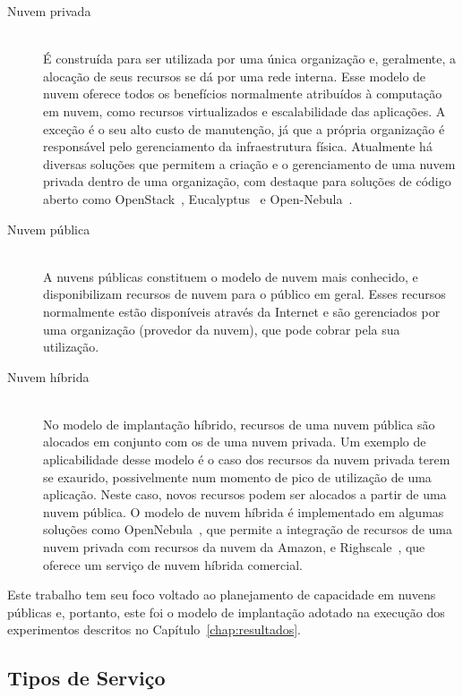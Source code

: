 \begin{description}
\item[Nuvem privada] \hfill \\ É construída para ser utilizada por uma única 
organização e, geralmente, a alocação de seus recursos se dá por uma rede interna. 
Esse modelo de nuvem oferece todos os benefícios normalmente atribuídos à computação 
em nuvem, como recursos virtualizados e escalabilidade das aplicações. A exceção 
é o seu alto custo de manutenção, já que a própria organização é responsável pelo 
gerenciamento da infraestrutura física. Atualmente há diversas soluções que permitem 
a criação e o gerenciamento de uma nuvem privada dentro de uma organização, com 
destaque para soluções de código aberto como OpenStack~\cite{openstack}, 
Eucalyptus~\cite{eucalyptus} e Open-Nebula~\cite{opennebula}.

\item[Nuvem pública] \hfill \\ A nuvens públicas constituem o modelo de nuvem 
mais conhecido, e disponibilizam recursos de nuvem para o público em geral. Esses 
recursos normalmente estão disponíveis através da Internet e são gerenciados por 
uma organização (provedor da nuvem), que pode cobrar pela sua utilização. 

\item[Nuvem híbrida] \hfill \\ No modelo de implantação híbrido, recursos de uma 
nuvem pública são alocados em conjunto com os de uma nuvem privada. Um exemplo de 
aplicabilidade desse modelo é o caso dos recursos da nuvem privada terem se exaurido,
possivelmente num momento de pico de utilização de uma aplicação. Neste caso, 
novos recursos podem ser alocados a partir de uma nuvem pública. O modelo de 
nuvem híbrida é implementado em algumas soluções como OpenNebula~\cite{opennebula}, 
que permite a integração de recursos de uma nuvem privada com recursos da nuvem 
da Amazon, e Righscale~\cite{rightscale}, que oferece um serviço de nuvem híbrida 
comercial.
\end{description}

Este trabalho tem seu foco voltado ao planejamento de capacidade em
nuvens públicas e, portanto, este foi o modelo de implantação adotado na execução
dos experimentos descritos no Capítulo~\ref{chap:resultados}. 

\subsection{Tipos de Serviço}

